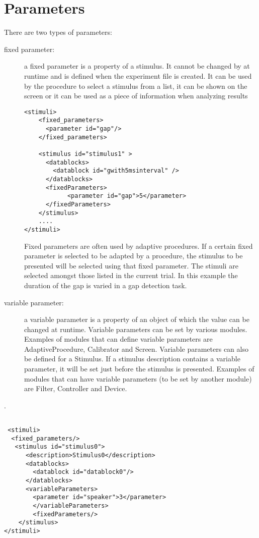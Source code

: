 \section{Parameters}

There are two types of parameters:
\begin{description}

\item [fixed parameter:] a fixed parameter is a property of a
stimulus. It cannot be changed by \apex at runtime and is defined
when the experiment file is created. It can be used by the
procedure to select a stimulus from a list, it can be shown on the
screen or it can be used as a piece of information when analyzing
results

\begin{lstlisting}
<stimuli>
    <fixed_parameters>
      <parameter id="gap"/>
    </fixed_parameters>

    <stimulus id="stimulus1" >
      <datablocks>
        <datablock id="gwith5msinterval" />
      </datablocks>
      <fixedParameters>
            <parameter id="gap">5</parameter>
      </fixedParameters>
    </stimulus>
    ....
</stimuli>
\end{lstlisting}

Fixed parameters are often used by adaptive procedures. If a
certain fixed parameter is selected to be adapted by a procedure,
the stimulus to be presented will be selected using that fixed
parameter. The stimuli are selected amongst those listed in the
current trial. In this example the duration of the gap is varied
in a gap detection task.

 \item [variable parameter:] a variable parameter is a
property of an object of which the value can be changed at
runtime. Variable parameters can be set by various \apex modules.
Examples of modules that can define variable parameters are
AdaptiveProcedure, Calibrator and Screen. Variable parameters can
also be defined for a Stimulus. If a stimulus description contains a
variable parameter, it will be set just before the stimulus is
presented. Examples of modules that can have variable parameters
(to be set by another module) are Filter, Controller and Device.
\end{description}.

\begin{lstlisting}

 <stimuli>
  <fixed_parameters/>
   <stimulus id="stimulus0">
      <description>Stimulus0</description>
      <datablocks>
        <datablock id="datablock0"/>
      </datablocks>
      <variableParameters>
        <parameter id="speaker">3</parameter>
        </variableParameters>
        <fixedParameters/>
    </stimulus>
</stimuli>

\end{lstlisting}


